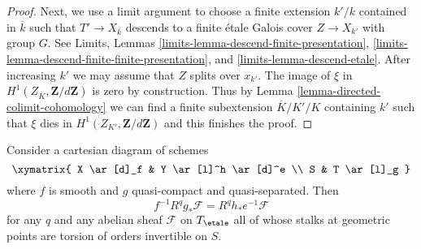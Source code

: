 \begin{proof}
\medskip\noindent
Next, we use a limit argument to choose a finite extension $k'/k$
contained in $\overline{k}$ such that $T' \to X_{\overline{k}}$
descends to a finite \'etale Galois cover $Z \to X_{k'}$ with group $G$.
See Limits, Lemmas \ref{limits-lemma-descend-finite-presentation},
\ref{limits-lemma-descend-finite-finite-presentation}, and
\ref{limits-lemma-descend-etale}.
After increasing $k'$ we may assume that $Z$ splits over $x_{k'}$.
The image of $\xi$ in
$H^1(Z_{\overline{K}}, \mathbf{Z}/d\mathbf{Z})$ is zero by construction.
Thus by Lemma \ref{lemma-directed-colimit-cohomology}
we can find a finite subextension $\overline{K}/K'/K$
containing $k'$ such that $\xi$ dies in $H^1(Z_{K'}, \mathbf{Z}/d\mathbf{Z})$
and this finishes the proof.
\end{proof}

\begin{theorem}
\label{theorem-smooth-base-change}
Consider a cartesian diagram of schemes
$$
\xymatrix{
X \ar[d]_f & Y \ar[l]^h \ar[d]^e \\
S & T \ar[l]_g
}
$$
where $f$ is smooth and $g$ quasi-compact and quasi-separated. Then
$$
f^{-1}R^qg_*\mathcal{F} = R^qh_*e^{-1}\mathcal{F}
$$
for any $q$ and any abelian sheaf $\mathcal{F}$
on $T_\etale$ all of whose stalks at geometric points are torsion of
orders invertible on $S$.
\end{theorem}

